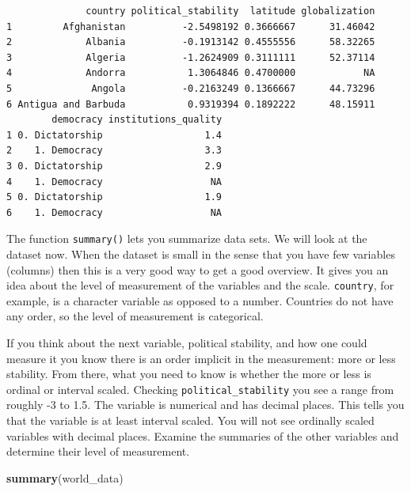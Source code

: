 \documentclass[]{article}
\newenvironment{Shaded}{\begin{snugshade}}{\end{snugshade}}
\newcommand{\KeywordTok}[1]{\textcolor[rgb]{0.13,0.29,0.53}{\textbf{#1}}}
\newcommand{\NormalTok}[1]{#1}
\theoremstyle{definition}
\theoremstyle{definition}
\theoremstyle{definition}
\theoremstyle{remark}
\begin{document}
\begin{verbatim}
              country political_stability  latitude globalization
1         Afghanistan          -2.5498192 0.3666667      31.46042
2             Albania          -0.1913142 0.4555556      58.32265
3             Algeria          -1.2624909 0.3111111      52.37114
4             Andorra           1.3064846 0.4700000            NA
5              Angola          -0.2163249 0.1366667      44.73296
6 Antigua and Barbuda           0.9319394 0.1892222      48.15911
        democracy institutions_quality
1 0. Dictatorship                  1.4
2    1. Democracy                  3.3
3 0. Dictatorship                  2.9
4    1. Democracy                   NA
5 0. Dictatorship                  1.9
6    1. Democracy                   NA
\end{verbatim}

The function \texttt{summary()} lets you summarize data sets. We will
look at the dataset now. When the dataset is small in the sense that you
have few variables (columns) then this is a very good way to get a good
overview. It gives you an idea about the level of measurement of the
variables and the scale. \texttt{country}, for example, is a character
variable as opposed to a number. Countries do not have any order, so the
level of measurement is categorical.

If you think about the next variable, political stability, and how one
could measure it you know there is an order implicit in the measurement:
more or less stability. From there, what you need to know is whether the
more or less is ordinal or interval scaled. Checking
\texttt{political\_stability} you see a range from roughly -3 to 1.5.
The variable is numerical and has decimal places. This tells you that
the variable is at least interval scaled. You will not see ordinally
scaled variables with decimal places. Examine the summaries of the other
variables and determine their level of measurement.

\begin{Shaded}
\begin{Highlighting}[]
\KeywordTok{summary}\NormalTok{(world_data)}
\end{Highlighting}
\end{Shaded}
\end{document}
